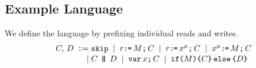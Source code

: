\subsection{Example Language}
\begin{comment}
\footnote{We only consider executions where register state is empty in
  forked threads.  Given item~\ref{pre-acquire} of
  Candidate~\ref{def:prefix}, a sufficient condition is that parallel
  composition is always preceded by an acquire fence, as in programs of the
  form:
  \begin{displaymath}
    \VAR\vec{\aLoc}\SEMI
    \vec{\aLoc}\GETS\vec{0}\SEMI
    \vec{\bLoc}\GETS\vec{0}\SEMI
    \FENCE\SEMI
    (\aCmd^1 \PAR \cdots \PAR \aCmd^n)
  \end{displaymath}
  where $\aCmd^1$, \ldots, $\aCmd^n$ do not include $\PAR$.  To avoid clutter
  in drawings, we often drop the explicit fence.}.
\end{comment}


We define the language by prefixing individual reads and writes.  %
\begin{align*}
\aCmd,\,\bCmd
\BNFDEF& \SKIP
\BNFSEP \aReg\GETS\aExp\SEMI \aCmd
\BNFSEP \aReg\GETS\aLoc^{\amode}\SEMI \aCmd 
\BNFSEP \aLoc^{\amode}\GETS\aExp\SEMI \aCmd
\\[-.5ex]
\BNFSEP&\aCmd \PAR[\aThrd][\bThrd] \bCmd
\BNFSEP \VAR\aLoc\SEMI \aCmd
\BNFSEP \IF{\aExp} \THEN \aCmd \ELSE \bCmd \FI
\end{align*}




